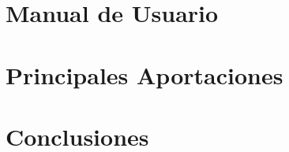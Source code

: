 \documentclass[12pt, a4paper]{report}
\begin{document}
\chapter{Manual de Usuario}
\newpage

\chapter{Principales Aportaciones}
\newpage

\chapter{Conclusiones}
\newpage
\end{document}
